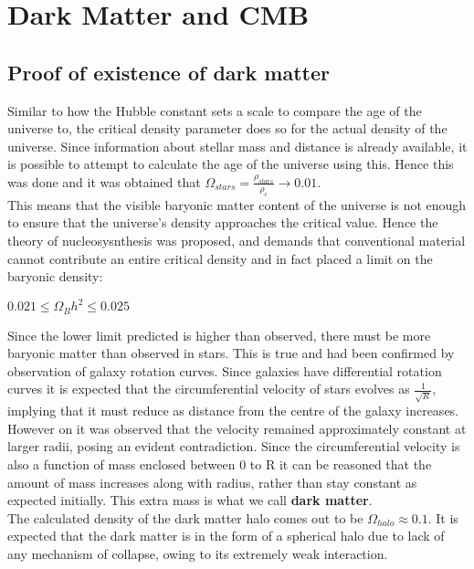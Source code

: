 \section{Dark Matter and CMB}
\subsection{Proof of existence of dark matter}

Similar to how the Hubble constant sets a scale to compare the age of the universe to, the critical density parameter does so for the actual density of the universe. Since information about stellar mass and distance is already available, it is possible to attempt to calculate the age of the universe using this. Hence this was done and it was obtained that $\Omega_{stars} = \frac{\rho_{stars}}{\rho_c}\rightarrow 0.01$.
\\
This means that the visible baryonic matter content of the universe is not enough to ensure that the universe's density approaches the critical value. Hence the theory of nucleosysnthesis was proposed, and demands that conventional material cannot contribute an entire critical density and in fact placed a limit on the baryonic density:

\begin{center}
    $0.021 \leq {\Omega_B}h^2 \leq 0.025$
\end{center}

Since the lower limit predicted is higher than observed, there must be more baryonic matter than observed in stars. This is true and had been confirmed by observation of galaxy rotation curves. Since galaxies have differential rotation curves it is expected that the circumferential velocity of stars evolves as $\frac{1}{\sqrt{R}}$, implying that it must reduce as distance from the centre of the galaxy increases. However on it was observed that the velocity remained approximately constant at larger radii, posing an evident contradiction. Since the circumferential velocity is also a function of mass enclosed between 0 to R it can be reasoned that the amount of mass increases along with radius, rather than stay constant as expected initially. This extra mass is what we call \textbf{dark matter}. 
\\
The calculated density of the dark matter halo comes out to be $\Omega_{halo} \approx 0.1$. It is expected that the dark matter is in the form of a spherical halo due to lack of any mechanism of collapse, owing to its extremely weak interaction.

